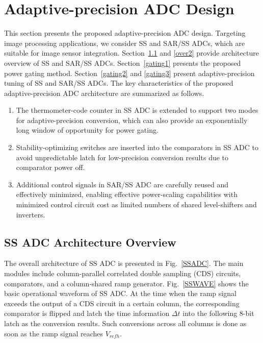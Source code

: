 \section{Adaptive-precision ADC Design}\label{architecture}

This section presents the proposed adaptive-precision ADC design. Targeting image processing applications, we consider SS and SAR/SS ADCs, which are suitable for image sensor integration. 
Section~\ref{over1} and \ref{over2} provide architecture overview of SS and SAR/SS ADCs. 
Section~\ref{gating1} presents the proposed power gating method. 
Section~\ref{gating2} and \ref{gating3} present adaptive-precision tuning of SS and SAR/SS ADCs. The key characteristics of the proposed adaptive-precision ADC architecture are summarized 
as follows. 


\begin{enumerate}[\IEEEsetlabelwidth{3)}]
	\item 
	The thermometer-code counter in SS ADC is extended to support two modes for adaptive-precision conversion, which can also provide an exponentially long window of opportunity for power gating.
	\item
    Stability-optimizing switches are inserted into the comparators in SS ADC to avoid unpredictable latch for low-precision conversion results due to comparator power off. 
    \item
    Additional control signals in SAR/SS ADC are carefully reused and effectively minimized, enabling effective power-scaling capabilities with minimized control circuit cost as limited numbers of shared level-shifters and inverters.      
\end{enumerate} 



\subsection{SS ADC Architecture Overview}\label{over1}

The overall architecture of SS ADC is presented in Fig.~\ref{SSADC}. The main modules include column-parallel correlated double sampling (CDS) circuits, comparators, 
and a column-shared ramp generator. Fig.~\ref{SSWAVE} shows the basic operational waveform of SS ADC. At the time when the ramp signal exceeds the output of a CDS circuit in a certain column, 
the corresponding comparator is flipped and latch the time information $\Delta t$ into the following 8-bit latch as the conversion results. 
Such conversions across all columns is done as soon as the ramp signal reaches $V_{refh}$.

